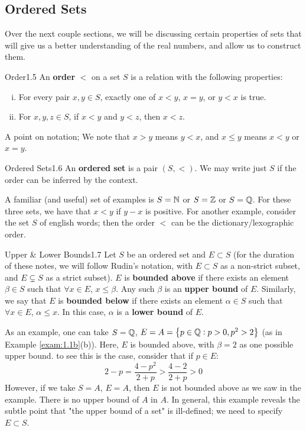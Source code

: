 \subsection{Ordered Sets}
Over the next couple sections, we will be discussing certain properties of sets that will give us a better understanding of the real numbers, and allow us to construct them.

\setcounter{rudin}{4}

\begin{definition}{Order}{1.5}
    An \textbf{order} $<$ on a set $S$ is a relation with the following properties:
    \begin{enumerate}[(i)]
        \item For every pair $x, y \in S$, exactly one of $x < y$, $x = y$, or $y < x$ is true. 
        \item For $x, y, z \in S$, if $x < y$ and $y < z$, then $x < z$. 
    \end{enumerate}
    A point on notation; We note that $x > y$ means $y < x$, and $x \leq y$ means $x < y$ or $x = y$. 
\end{definition}

\begin{definition}{Ordered Sets}{1.6}
    An \textbf{ordered set} is a pair $(S, <)$. We may write just $S$ if the order can be inferred by the context.
\end{definition}
\noindent A familiar (and useful) set of examples is $S = \mathbb{N}$ or $S = \mathbb{Z}$ or $S = \mathbb{Q}$. For these three sets, we have that $x < y$ if $y-x$ is positive. For another example, consider the set $S$ of english words; then the order $<$ can be the dictionary/lexographic order. 

\begin{definition}{Upper \& Lower Bounds}{1.7}
    Let $S$ be an ordered set and $E \subset S$ (for the duration of these notes, we will follow Rudin's notation, with $E \subset S$ as a non-strict subset, and $E \subsetneq S$ as a strict subset). $E$ is \textbf{bounded above} if there exists an element $\beta \in S$ such that $\forall x \in E$, $x \leq \beta$. Any such $\beta$ is an \textbf{upper bound} of $E$. Similarly, we say that $E$ is \textbf{bounded below} if there exists an element $\alpha \in S$ such that $\forall x \in E$, $\alpha \leq x$. In this case, $\alpha$ is a \textbf{lower bound} of $E$.
\end{definition}
\noindent As an example, one can take $S = \mathbb{Q}$, $E = A = \set{p \in \mathbb{Q}: p > 0, p^2 > 2}$ (as in Example \ref{exam:1.1b}(b)). Here, $E$ is bounded above, with $\beta = 2$ as one possible upper bound. to see this is the case, consider that if $p \in E$:
\[2 - p = \frac{4 - p^2}{2+p} > \frac{4-2}{2+p} > 0\]
\noindent However, if we take $S = A$, $E = A$, then $E$ is not bounded above as we saw in the example. There is no upper bound of $A$ in $A$. In general, this example reveals the subtle point that "the upper bound of a set" is ill-defined; we need to specify $E \subset S$. 

